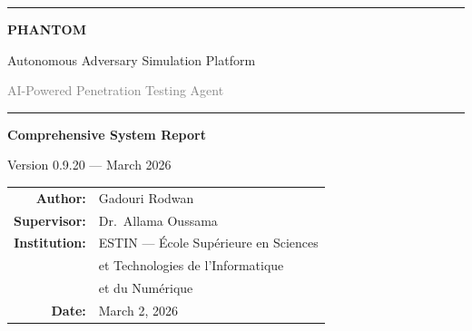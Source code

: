 \documentclass[12pt,a4paper,twoside]{report}
\begin{document}
\begin{titlepage}
\centering
\vspace*{1.5cm}

\noindent\textcolor{phantom}{\rule{\textwidth}{2pt}}
\vspace{1cm}

{\fontsize{50}{55}\selectfont\bfseries\textcolor{phantom}{PHANTOM}\par}
\vspace{0.6cm}
{\LARGE\textcolor{phantomdark}{Autonomous Adversary Simulation Platform}\par}
\vspace{0.3cm}
{\large\textcolor{graytext}{AI-Powered Penetration Testing Agent}\par}

\vspace{1cm}
\noindent\textcolor{phantom}{\rule{\textwidth}{2pt}}

\vspace{2cm}

\begin{tcolorbox}[
    enhanced,
    colback=phantom!5,
    colframe=phantom,
    arc=5pt,
    boxrule=1pt,
    width=0.85\textwidth,
    halign=center,
    drop shadow southeast={opacity=0.2},
]
\centering
{\Large\bfseries Comprehensive System Report\par}
\vspace{0.3cm}
{\large Version 0.9.20 --- March 2026\par}
\end{tcolorbox}

\vspace{2cm}

\begin{tabular}{rl}
\textcolor{phantom}{\bfseries Author:}     & \large Gadouri Rodwan \\[6pt]
\textcolor{phantom}{\bfseries Supervisor:}  & \large Dr.\ Allama Oussama \\[6pt]
\textcolor{phantom}{\bfseries Institution:} & \large ESTIN --- \'Ecole Sup\'erieure en Sciences \\
                                            & \large et Technologies de l'Informatique \\
                                            & \large et du Num\'erique \\[6pt]
\textcolor{phantom}{\bfseries Date:}        & \large March 2, 2026 \\
\end{tabular}


\end{titlepage}
\end{document}
